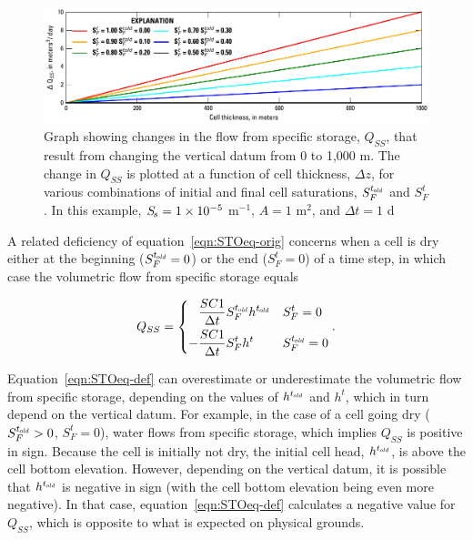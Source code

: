 \begin{figure}
	\begin{center}
	\includegraphics{./Figures/STOSsError.pdf}
	\caption[Graph showing changes in the flow from specific storage that result from changing the vertical datum]{Graph showing changes in the flow from specific storage, $Q_{SS}$, that result from changing the vertical datum from 0 to 1,000 m. The change in $Q_{SS}$ is plotted at a function of cell thickness, $\Delta z$, for various combinations of initial and final cell saturations, $S_F^{t_\mathit{\kern -0.07em old}}$ and $S_F^t$. In this example, ${S_{\kern -.1em s}} = 1\times10^{-5}$ m$^{-1}$, $A = 1$ m$^2$, and $\Delta t = 1$ d}
	\label{fig:orig-sserror}
	\end{center}
\end{figure}

A related deficiency of equation~\ref{eqn:STOeq-orig} concerns when a cell is dry either at the beginning ($S_F^{t_\mathit{\kern -0.07em old}} = 0$) or the end ($S_F^t = 0$) of a time step, in which case the volumetric flow from specific storage equals 

\begin{align}
	\label{eqn:STOeq-def}
	Q_{SS} = \begin{dcases}
		\phantom{-} \frac{SC1}{\Delta t} S_F^{t_\mathit{\kern -0.07em old}} h^{t_\mathit{\kern -0.07em old}} & S_F^t = 0 \\
		- \frac{SC1}{\Delta t} S_F^t h^{t} & S_F^{t_\mathit{\kern -0.07em old}} = 0
	\end{dcases} .
\end{align}

\noindent Equation~\ref{eqn:STOeq-def} can overestimate or underestimate the volumetric flow from specific storage, depending on the values of $h^{t_\mathit{\kern -0.07em old}}$ and $h^t$, which in turn depend on the vertical datum. For example, in the case of a cell going dry ($S_F^{t_\mathit{\kern -0.07em old}} > 0$, $S_F^t = 0$), water flows from specific storage, which implies $Q_{SS}$ is positive in sign. Because the cell is initially not dry, the initial cell head, $h^{t_\mathit{\kern -0.07em old}}$, is above the cell bottom elevation. However, depending on the vertical datum, it is possible that $h^{t_\mathit{\kern -0.07em old}}$ is negative in sign (with the cell bottom elevation being even more negative). In that case, equation~\ref{eqn:STOeq-def} calculates a negative value for $Q_{SS}$, which is opposite to what is expected on physical grounds.

